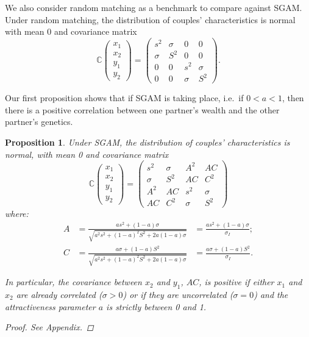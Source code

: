 \documentclass[
  12pt,
]{article}
\newtheorem{proposition}{Proposition}
\theoremstyle{definition}
\theoremstyle{definition}
\theoremstyle{definition}
\theoremstyle{definition}
\theoremstyle{remark}
\begin{document}
We also consider random matching as a benchmark to compare against SGAM. Under
random matching, the distribution of couples' characteristics is normal with
mean 0 and covariance matrix
\[
\mathbb{C}\left( 
\begin{array}{c}
x_{1} \\ 
x_{2} \\ 
y_{1} \\ 
y_{2}%
\end{array}%
\right) =\allowbreak \left( 
\begin{array}{cccc}
s^{2} & \sigma & 0 & 0 \\ 
\sigma & S^{2} & 0 & 0 \\ 
0 & 0 & s^{2} & \sigma \\ 
0 & 0 & \sigma & S^{2}%
\end{array}%
\right). \allowbreak 
\]

Our first proposition shows that if SGAM is taking place, i.e.~if \(0 < a < 1\), then
there is a positive correlation between one partner's wealth and the other
partner's genetics.

\begin{proposition}\label{prop-couples-SGAM}
Under SGAM, the distribution of couples' characteristics is normal, with mean 0
and covariance matrix
\begin{equation}\label{cov-couples-SGAM}
\mathbb{C}\left( 
\begin{array}{c}
x_{1} \\ 
x_{2} \\ 
y_{1} \\ 
y_{2}%
\end{array}%
\right) =\allowbreak \left( 
\begin{array}{cccc}
s^{2} & \sigma  & A^{2} & AC \\ 
\sigma  & S^{2} & AC & C^{2} \\ 
A^{2} & AC & s^{2} & \sigma  \\ 
AC & C^{2} & \sigma  & S^{2}%
\end{array}%
\right) \allowbreak 
\end{equation}
where:
\begin{align*}
A &= \frac{as^{2}+\left( 1-a\right) \sigma }{\sqrt{a^{2}s^{2}+\left(
1-a\right) ^{2}S^{2}+2a\left( 1-a\right) \sigma }} &= \frac{as^{2}+\left( 1-a\right) \sigma }{\sigma_I}; \\
C &= \frac{a\sigma +\left( 1-a\right) S^{2}}{\sqrt{a^{2}s^{2}+\left(
1-a\right) ^{2}S^{2}+2a\left( 1-a\right) \sigma }} &= \frac{a\sigma +\left( 1-a\right) S^{2}}{\sigma_I}.
\end{align*}

In particular, the covariance between $x_2$ and $y_1$, $AC$, is positive if
either $x_1$ and $x_2$ are already correlated ($\sigma > 0$) or if they are
uncorrelated ($\sigma = 0$) and the attractiveness parameter $a$ is strictly
between 0 and 1.

\begin{proof}
See Appendix.
\end{proof}
\end{proposition}
\end{document}

